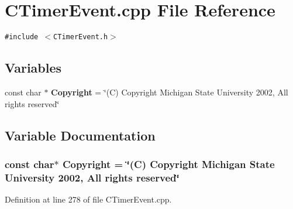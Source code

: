 \section{CTimer\-Event.cpp File Reference}
\label{CTimerEvent_8cpp}
{\tt \#include $<$CTimer\-Event.h$>$}\par
\subsection*{Variables}
\begin{CompactItemize}
\item 
const char $\ast$ {\bf Copyright} = \char`\"{}(C) Copyright Michigan State University 2002, All rights reserved\char`\"{}
\end{CompactItemize}


\subsection{Variable Documentation}
\subsubsection{\setlength{\rightskip}{0pt plus 5cm}const char$\ast$ Copyright = \char`\"{}(C) Copyright Michigan State University 2002, All rights reserved\char`\"{}\hspace{0.3cm}{\tt  [static]}}\label{CTimerEvent_8cpp_a0}




Definition at line 278 of file CTimer\-Event.cpp.